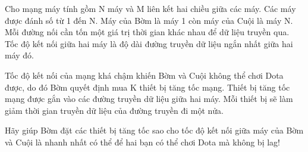 Cho mạng máy tính gồm N máy và M liên kết hai chiều giữa các máy. Các máy được đánh số từ 1 đến N. Máy của Bờm là máy 1 còn máy của Cuội là máy N. Mỗi đường nối cần tốn một giá trị thời gian khác nhau để dữ liệu truyền qua. Tốc độ kết nối giữa hai máy là độ dài đường truyền dữ liệu ngắn nhất giữa hai máy đó.  

   Tốc độ kết nối của mạng khá chậm khiến Bờm và Cuội không thể chơi Dota được, do đó Bờm quyết định mua K thiết bị tăng tốc mạng. Thiết bị tăng tốc mạng được gắn vào các đường truyền dữ liệu giữa hai máy. Mỗi thiết bị sẽ làm giảm thời gian truyền dữ liệu của đường truyền đi một nửa.  

   Hãy giúp Bờm đặt các thiết bị tăng tốc sao cho tốc độ kết nối giữa máy của Bờm và Cuội là nhanh nhất có thể để hai bạn có thể chơi Dota mà không bị lag!